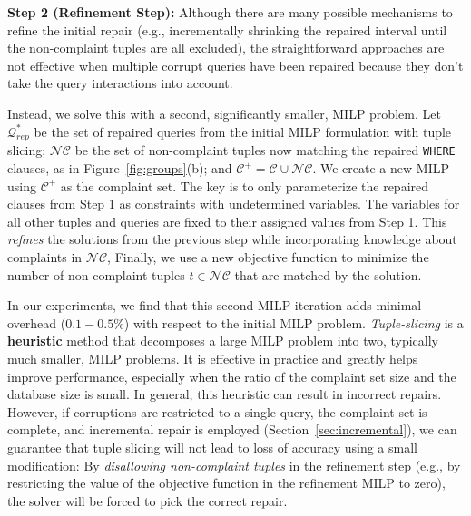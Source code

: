 \smallskip

\noindent\textbf{Step 2 (Refinement Step):} 
Although there are many possible mechanisms to refine the initial repair (e.g., incrementally shrinking
the repaired interval until the non-complaint tuples are all excluded), 
the straightforward approaches are not effective when multiple corrupt 
queries have been repaired because they don't take the query interactions into account.

Instead, we solve this with a second, significantly smaller, MILP problem.   
Let $\mathcal{Q}^*_{rep}$ be the set of repaired queries from the  initial MILP formulation with tuple slicing;
$\mathcal{NC}$ be the set of non-complaint tuples now matching the repaired \texttt{WHERE} clauses, as in Figure~\ref{fig:groups}(b); and $\mathcal{C}^+ = \mathcal{C} \cup \mathcal{NC}$.
We create a new MILP using $\mathcal{C}^+$ as the complaint set.  
The key is to only parameterize the repaired clauses from Step 1 as constraints with undetermined variables.
The variables for all other tuples and queries are fixed to their assigned values from Step 1.
This \emph{refines} the solutions from the previous step while incorporating knowledge about complaints in $\mathcal{NC}$, 
Finally, we use a new objective function to minimize the number of non-complaint tuples 
$t \in \mathcal{NC}$ that are matched by the solution.


In our experiments, we find that this second MILP iteration adds
minimal overhead ($0.1-0.5\%$) with respect to the initial MILP
problem.   
\emph{Tuple-slicing} is a \textbf{heuristic} method that decomposes a large
MILP problem into two, typically much smaller, MILP problems. It is effective
in practice and greatly helps improve \sys performance, especially when the
ratio of the complaint set size and the database size is small. In general,
this heuristic can result in incorrect repairs. However, if corruptions are
restricted to a single query, the complaint set is complete, and incremental repair is employed (Section~\ref{sec:incremental}), we can
guarantee that tuple slicing will not lead to loss of accuracy using a small
modification: By \emph{disallowing non-complaint tuples} in the refinement
step (e.g., by restricting the value of the objective function in the
refinement MILP to zero), the solver will be forced to pick the correct
repair. 
% 





